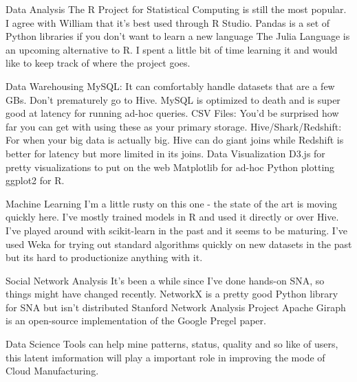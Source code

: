 \begin{asparadesc}
\item[Data Analysis] The R Project for Statistical Computing is still the most popular. I agree with William that it's best used through R Studio.
Pandas is a set of Python libraries if you don't want to learn a new language
The Julia Language is an upcoming alternative to R. I spent a little bit of time learning it and would like to keep track of where the project goes.
\item[Data Warehousing] MySQL: It can comfortably handle datasets that are a few GBs. Don't prematurely go to Hive. MySQL is optimized to death and is super good at latency for running ad-hoc queries.
CSV Files: You'd be surprised how far you can get with using these as your primary storage.
Hive/Shark/Redshift: For when your big data is actually big. Hive can do giant joins while Redshift is better for latency but more limited in its joins.
Data Visualization
D3.js for pretty visualizations to put on the web
Matplotlib for ad-hoc Python plotting
ggplot2 for R.
\item[Machine Learning] I'm a little rusty on this one - the state of the art is moving quickly here.
I've mostly trained models in R and used it directly or over Hive.
I've played around with scikit-learn in the past and it seems to be maturing.
I've used Weka for trying out standard algorithms quickly on new datasets in the past but its hard to productionize anything with it.
\item[Social Network Analysis] It's been a while since I've done hands-on SNA, so things might have changed recently.
NetworkX is a pretty good Python library for SNA but isn't distributed
Stanford Network Analysis Project
Apache Giraph is an open-source implementation of the Google Pregel paper. 
\end{asparadesc}

Data Science Tools can help mine patterns, status, quality and so like of users, this latent imformation will play a important role in improving the mode of Cloud Manufacturing.
